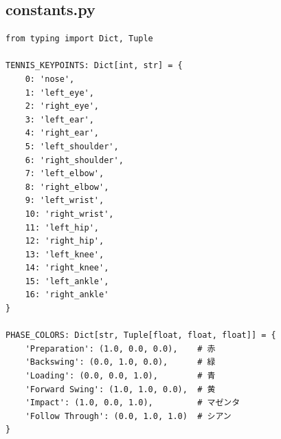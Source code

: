 \documentclass[oneside]{suribt}[11pt]
\begin{document}
\subsection{constants.py}
\begin{lstlisting}
from typing import Dict, Tuple

TENNIS_KEYPOINTS: Dict[int, str] = {
    0: 'nose',
    1: 'left_eye',
    2: 'right_eye',
    3: 'left_ear',
    4: 'right_ear',
    5: 'left_shoulder',
    6: 'right_shoulder',
    7: 'left_elbow',
    8: 'right_elbow',
    9: 'left_wrist',
    10: 'right_wrist',
    11: 'left_hip',
    12: 'right_hip',
    13: 'left_knee',
    14: 'right_knee',
    15: 'left_ankle',
    16: 'right_ankle'
}

PHASE_COLORS: Dict[str, Tuple[float, float, float]] = {
    'Preparation': (1.0, 0.0, 0.0),    # 赤
    'Backswing': (0.0, 1.0, 0.0),      # 緑
    'Loading': (0.0, 0.0, 1.0),        # 青
    'Forward Swing': (1.0, 1.0, 0.0),  # 黄
    'Impact': (1.0, 0.0, 1.0),         # マゼンタ
    'Follow Through': (0.0, 1.0, 1.0)  # シアン
}
\end{lstlisting}
\end{document}
